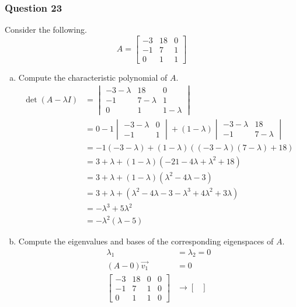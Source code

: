 \documentclass{math}
\begin{document}
\subsubsection*{Question 23}
Consider the following.
\[ A = \begin{bmatrix}
  -3 & 18 & 0 \\
  -1 & 7 & 1 \\
  0 & 1 & 1
\end{bmatrix} \]
\begin{enumerate}[(a)]
  \item Compute the characteristic polynomial of \( A \).
  \begin{align*}
    \det(A-\lambda I) &= \begin{vmatrix}
      -3-\lambda & 18 & 0 \\
      -1 & 7-\lambda & 1 \\
      0 & 1 & 1-\lambda
    \end{vmatrix} \\
    &= 0-1\begin{vmatrix}
      -3-\lambda & 0 \\
      -1 & 1
    \end{vmatrix}+(1-\lambda)\begin{vmatrix}
      -3-\lambda & 18 \\
      -1 & 7-\lambda
    \end{vmatrix} \\
    &= -1(-3-\lambda)+(1-\lambda)((-3-\lambda)(7-\lambda)+18) \\
    &= 3+\lambda+(1-\lambda)(-21-4\lambda+\lambda^2+18) \\
    &= 3+\lambda+(1-\lambda)(\lambda^2-4\lambda-3) \\
    &= 3+\lambda+(\lambda^2-4\lambda-3-\lambda^3+4\lambda^2+3\lambda) \\
    &= -\lambda^3+5\lambda^2 \\
    &= -\lambda^2(\lambda-5)
  \end{align*}
  \item Compute the eigenvalues and bases of the corresponding eigenspaces of
    \( A \).
  \begin{align*}
    \lambda_1 &= \lambda_2 = 0 \\
    (A-0)\vec{v_1} &= 0 \\
    \begin{bmatrix}
      -3 & 18 & 0 & 0 \\
      -1 & 7 & 1 & 0 \\
      0 & 1 & 1 & 0
    \end{bmatrix} &\to \begin{bmatrix}

\end{bmatrix}
\end{align*}
\end{enumerate}
\end{document}
